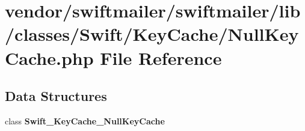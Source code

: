 \section{vendor/swiftmailer/swiftmailer/lib/classes/\+Swift/\+Key\+Cache/\+Null\+Key\+Cache.php File Reference}
\label{_null_key_cache_8php}
\subsection*{Data Structures}
\begin{DoxyCompactItemize}
\item 
class {\bf Swift\+\_\+\+Key\+Cache\+\_\+\+Null\+Key\+Cache}
\end{DoxyCompactItemize}
